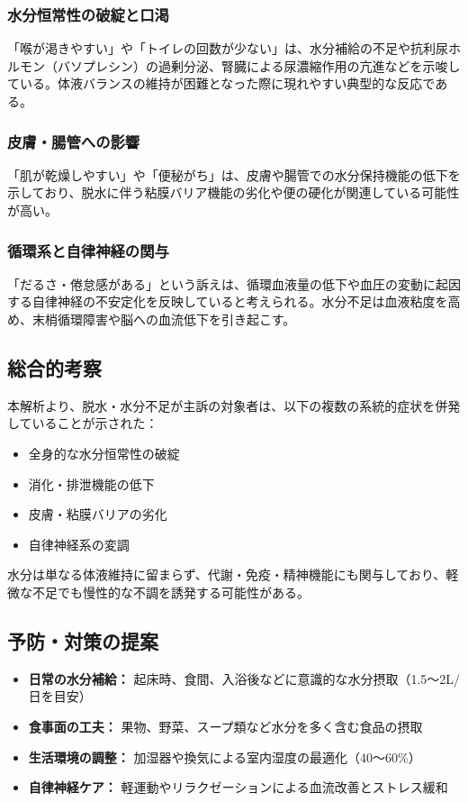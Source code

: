 \documentclass[a4paper,12pt]{article}
\begin{document}
\subsubsection*{水分恒常性の破綻と口渇}

「喉が渇きやすい」や「トイレの回数が少ない」は、水分補給の不足や抗利尿ホルモン（バソプレシン）の過剰分泌、腎臓による尿濃縮作用の亢進などを示唆している。体液バランスの維持が困難となった際に現れやすい典型的な反応である。

\subsubsection*{皮膚・腸管への影響}

「肌が乾燥しやすい」や「便秘がち」は、皮膚や腸管での水分保持機能の低下を示しており、脱水に伴う粘膜バリア機能の劣化や便の硬化が関連している可能性が高い。

\subsubsection*{循環系と自律神経の関与}

「だるさ・倦怠感がある」という訴えは、循環血液量の低下や血圧の変動に起因する自律神経の不安定化を反映していると考えられる。水分不足は血液粘度を高め、末梢循環障害や脳への血流低下を引き起こす。

\subsection*{総合的考察}

本解析より、脱水・水分不足が主訴の対象者は、以下の複数の系統的症状を併発していることが示された：

\begin{itemize}
  \item 全身的な水分恒常性の破綻
  \item 消化・排泄機能の低下
  \item 皮膚・粘膜バリアの劣化
  \item 自律神経系の変調
\end{itemize}

水分は単なる体液維持に留まらず、代謝・免疫・精神機能にも関与しており、軽微な不足でも慢性的な不調を誘発する可能性がある。

\subsection*{予防・対策の提案}

\begin{itemize}
  \item \textbf{日常の水分補給：} 起床時、食間、入浴後などに意識的な水分摂取（1.5〜2L/日を目安）
  \item \textbf{食事面の工夫：} 果物、野菜、スープ類など水分を多く含む食品の摂取
  \item \textbf{生活環境の調整：} 加湿器や換気による室内湿度の最適化（40〜60\%）
  \item \textbf{自律神経ケア：} 軽運動やリラクゼーションによる血流改善とストレス緩和
\end{itemize}
\end{document}
